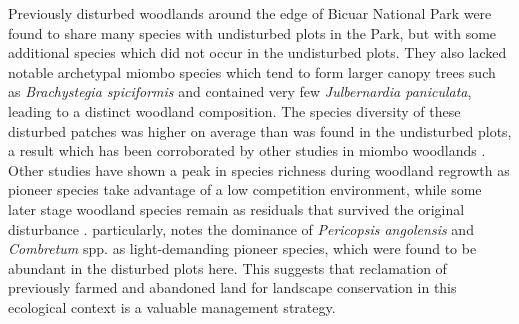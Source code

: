 \begin{refsection}
Previously disturbed woodlands around the edge of Bicuar National Park were found to share many species with undisturbed plots in the Park, but with some additional species which did not occur in the undisturbed plots. They also lacked notable archetypal miombo species which tend to form larger canopy trees such as \textit{Brachystegia spiciformis} and contained very few \textit{Julbernardia paniculata}, leading to a distinct woodland composition. The species diversity of these disturbed patches was higher on average than was found in the undisturbed plots, a result which has been corroborated by other studies in miombo woodlands \citep{Caro2001, McNicol2018b, Shackleton2000}. Other studies have shown a peak in species richness during woodland regrowth as pioneer species take advantage of a low competition environment, while some later stage woodland species remain as residuals that survived the original disturbance \citep{Goncalves2017, Kalaba2013}. \citet{Goncalves2017} particularly, notes the dominance of \textit{Pericopsis angolensis} and \textit{Combretum} spp. as light-demanding pioneer species, which were found to be abundant in the disturbed plots here. This suggests that reclamation of previously farmed and abandoned land for landscape conservation in this ecological context is a valuable management strategy.


\end{refsection}
